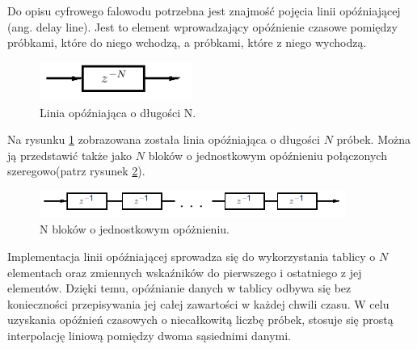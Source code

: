 Do opisu cyfrowego falowodu potrzebna jest znajmość pojęcia linii opóźniającej (ang. delay line). Jest to element wprowadzający opóźnienie czasowe pomiędzy próbkami, które do niego wchodzą, a próbkami, które z niego wychodzą. 
\begin{figure}[H]
	\centering
	\includegraphics[width=5cm]{grafiki/linia}
	\captionsetup{justification=centering}
	\caption{Linia opóźniająca o długości N.}
	\label{rys:delay_line}
\end{figure}
Na rysunku \ref{rys:delay_line} zobrazowana została linia opóźniająca o długości $N$ próbek. Można ją przedstawić także jako $N$ bloków o jednostkowym opóźnieniu połączonych szeregowo(patrz rysunek \ref{rys:model_delay_line2}).
\begin{figure}[H]
	\centering
	\includegraphics[width=10cm]{grafiki/model_linie}
	\captionsetup{justification=centering}
	\caption{N bloków o jednostkowym opóżnieniu.}
	\label{rys:model_delay_line2}
\end{figure}
 Implementacja linii opóźniającej sprowadza się do wykorzystania tablicy o $N$ elementach oraz zmiennych wskaźników do pierwszego i ostatniego z jej elementów. Dzięki temu, opóźnianie danych w tablicy odbywa się bez konieczności przepisywania jej całej zawartości w każdej chwili czasu. W celu uzyskania opóźnień czasowych o niecałkowitą liczbę próbek, stosuje się prostą interpolację liniową pomiędzy dwoma sąsiednimi danymi.


